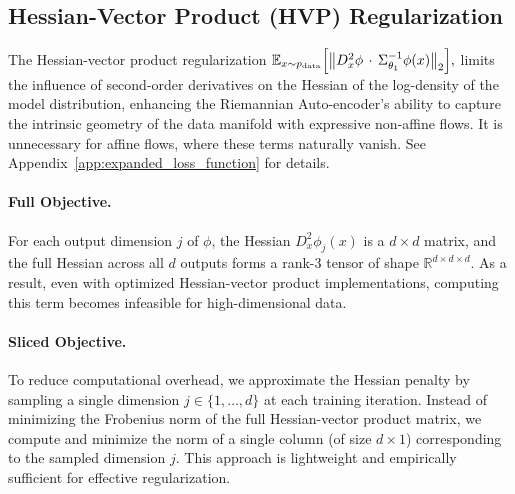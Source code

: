 \subsection{Hessian-Vector Product (HVP) Regularization}
\label{app:hvp-regularization}

The Hessian-vector product regularization \(
\mathbb{E}_{x \sim p_{\text{data}}}\Bigl[
   \bigl\|D^2_x \phi 
   \,\cdot\, \Sigma_{\theta_1}^{-1} \phi(x)
   \bigr\|_2
\Bigr],
\) limits the influence of second-order derivatives on the Hessian of the log-density of the model distribution, enhancing the Riemannian Auto-encoder's ability to capture the intrinsic geometry of the data manifold with expressive non-affine flows. It is unnecessary for affine flows, where these terms naturally vanish. See Appendix~\ref{app:expanded_loss_function} for details.

\paragraph{Full Objective.}
For each output dimension \(j\) of \(\phi\), the Hessian \(D^2_x \phi_j(x)\) is a \(d \times d\) matrix, and the full Hessian across all \(d\) outputs forms a rank-3 tensor of shape \(\mathbb{R}^{d \times d \times d}\). As a result, even with optimized Hessian-vector product implementations, computing this term becomes infeasible for high-dimensional data.


\paragraph{Sliced Objective.}  
To reduce computational overhead, we approximate the Hessian penalty by sampling a single dimension \(j \in \{1, \ldots, d\}\) at each training iteration. Instead of minimizing the Frobenius norm of the full Hessian-vector product matrix, we compute and minimize the norm of a single column (of size \(d \times 1\)) corresponding to the sampled dimension \(j\). This approach is lightweight and empirically sufficient for effective regularization.

